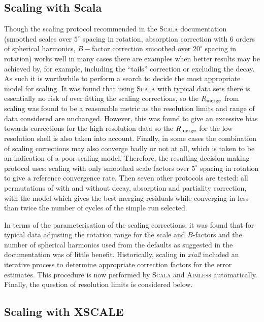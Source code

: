 \documentclass[preprint,pdf]{iucr}
\begin{document}
\subsection{Scaling with Scala}

Though the scaling protocol recommended in the \textsc{Scala} documentation
(smoothed scales over $5^{\circ}$ spacing in rotation, absorption
correction with 6 orders of spherical harmonics, $B-$factor correction
smoothed over $20^{\circ}$ spacing in rotation) works well in many
cases there are examples when better results may be achieved by,
for example, including the ``tails'' correction or excluding the
decay. As such it is worthwhile to perform a search to decide the most
appropriate model for scaling. It was found that using \textsc{Scala}
with typical data sets there is essentially no risk of over fitting
the scaling corrections, so the $R_{\rm{merge}}$ from scaling was found to
be a reasonable metric as the resolution limits and range of data
considered are unchanged. However, this was found to give an excessive
bias towards corrections for the high resolution data so the
$R_{\rm{merge}}$ for the low
resolution shell is also taken into account. Finally, in
some cases the combination of scaling corrections may also converge
badly or not at all, which is taken to be an indication of a poor
scaling model. Therefore, the resulting decision making
protocol uses: scaling with only smoothed scale
factors over $5^{\circ}$ spacing in rotation to give a reference
convergence rate. Then seven other protocols are tested: 
all permutations of with and
without decay, absorption and partiality correction, with the model
which gives the best merging residuals while converging in less than
twice the number of cycles of the simple run selected. 

In terms of the parameterisation of the scaling
corrections, it was found that for
typical data adjusting the rotation range for the scale and
$B$-factors and the number of spherical harmonics used from the
defaults as suggested in the documentation was of little benefit.
Historically, scaling in \emph{xia2} included an iterative process to
determine appropriate correction factors for the error estimates. This
procedure is now performed by \textsc{Scala} and \textsc{Aimless} automatically.
Finally, the question of resolution limits is considered below.

\subsection{Scaling with XSCALE}
\end{document}
